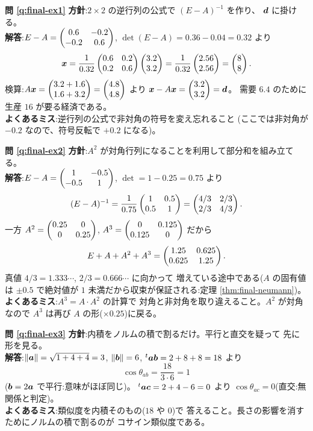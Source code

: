 \bigskip
\noindent\textbf{問 \ref{q:final-ex1}}\quad
\textbf{方針}:$2 \times 2$ の逆行列の公式で $(E - A)^{-1}$ を作り、
$\bm{d}$ に掛ける。\\
\textbf{解答}:$E - A = \begin{pmatrix}0.6 & -0.2 \\ -0.2 & 0.6\end{pmatrix}$,
$\det(E - A) = 0.36 - 0.04 = 0.32$ より
\[
\bm{x} = \frac{1}{0.32}\begin{pmatrix}0.6 & 0.2 \\ 0.2 & 0.6\end{pmatrix}\begin{pmatrix}3.2 \\ 3.2\end{pmatrix}
= \frac{1}{0.32}\begin{pmatrix}2.56 \\ 2.56\end{pmatrix} = \begin{pmatrix}8 \\ 8\end{pmatrix}.
\]
検算:$A\bm{x} = \begin{pmatrix}3.2 + 1.6 \\ 1.6 + 3.2\end{pmatrix} = \begin{pmatrix}4.8 \\ 4.8\end{pmatrix}$
より $\bm{x} - A\bm{x} = \begin{pmatrix}3.2 \\ 3.2\end{pmatrix} = \bm{d}$。
需要 $6.4$ のために生産 $16$ が要る経済である。\\
\textbf{よくあるミス}:逆行列の公式で非対角の符号を変え忘れること
(ここでは非対角が $-0.2$ なので、符号反転で $+0.2$ になる)。

\bigskip
\noindent\textbf{問 \ref{q:final-ex2}}\quad
\textbf{方針}:$A^2$ が対角行列になることを利用して部分和を組み立てる。\\
\textbf{解答}:$E - A = \begin{pmatrix}1 & -0.5 \\ -0.5 & 1\end{pmatrix}$,
$\det = 1 - 0.25 = 0.75$ より
\[
(E - A)^{-1} = \frac{1}{0.75}\begin{pmatrix}1 & 0.5 \\ 0.5 & 1\end{pmatrix}
= \begin{pmatrix}4/3 & 2/3 \\ 2/3 & 4/3\end{pmatrix}.
\]
一方 $A^2 = \begin{pmatrix}0.25 & 0 \\ 0 & 0.25\end{pmatrix}$,
$A^3 = \begin{pmatrix}0 & 0.125 \\ 0.125 & 0\end{pmatrix}$ だから
\[
E + A + A^2 + A^3 = \begin{pmatrix}1.25 & 0.625 \\ 0.625 & 1.25\end{pmatrix}.
\]
真値 $4/3 = 1.333\cdots$, $2/3 = 0.666\cdots$ に向かって
増えている途中である($A$ の固有値は $\pm 0.5$ で絶対値が
$1$ 未満だから収束が保証される:定理 \ref{thm:final-neumann})。\\
\textbf{よくあるミス}:$A^3 = A \cdot A^2$ の計算で
対角と非対角を取り違えること。$A^2$ が対角なので
$A^3$ は再び $A$ の形($\times 0.25$)に戻る。

\bigskip
\noindent\textbf{問 \ref{q:final-ex3}}\quad
\textbf{方針}:内積をノルムの積で割るだけ。平行と直交を疑って
先に形を見る。\\
\textbf{解答}:$\|\bm{a}\| = \sqrt{1 + 4 + 4} = 3$,
$\|\bm{b}\| = 6$, ${}^t\bm{a}\bm{b} = 2 + 8 + 8 = 18$ より
\[
\cos\theta_{ab} = \frac{18}{3 \cdot 6} = 1
\]
($\bm{b} = 2\bm{a}$ で平行:意味がほぼ同じ)。
${}^t\bm{a}\bm{c} = 2 + 4 - 6 = 0$ より
$\cos\theta_{ac} = 0$(直交:無関係と判定)。\\
\textbf{よくあるミス}:類似度を内積そのもの($18$ や $0$)で
答えること。長さの影響を消すためにノルムの積で割るのが
コサイン類似度である。

